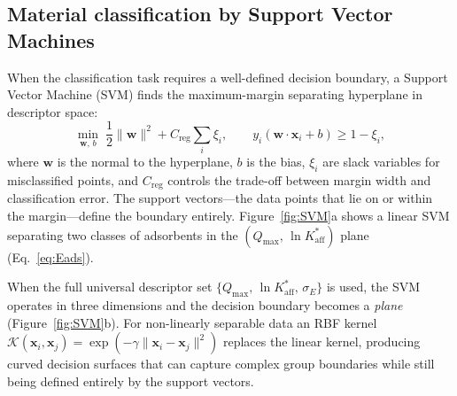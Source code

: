 \documentclass[journal=jacsat,manuscript=article]{achemso}
\begin{document}
	\subsection{Material classification by Support Vector Machines}
	\label{sec:SVM}

	When the classification task requires a well-defined decision boundary, a Support Vector Machine (SVM) finds the maximum-margin separating hyperplane in descriptor space:
	\begin{equation}
		\min_{\mathbf{w},\,b}\;
		\frac{1}{2}\|\mathbf{w}\|^2
		+ C_{\mathrm{reg}}\sum_{i}\xi_i,
		\qquad
		y_i(\mathbf{w}\cdot\mathbf{x}_i + b) \ge 1 - \xi_i,
		\label{eq:SVM}
	\end{equation}
	where $\mathbf{w}$ is the normal to the hyperplane, $b$ is the bias, $\xi_i$ are slack variables for misclassified points, and $C_{\mathrm{reg}}$ controls the trade-off between margin width and classification error. The support vectors---the data points that lie on or within the margin---define the boundary entirely. Figure~\ref{fig:SVM}a shows a linear SVM separating two classes of adsorbents in the $(Q_{\max},\, \ln K_{\mathrm{aff}}^{\ast})$ plane (Eq.~\eqref{eq:Eads}).

	When the full universal descriptor set $\{Q_{\max},\, \ln K_{\mathrm{aff}}^{\ast},\, \sigma_E\}$ is used, the SVM operates in three dimensions and the decision boundary becomes a \emph{plane} (Figure~\ref{fig:SVM}b). For non-linearly separable data an RBF kernel $\mathcal{K}(\mathbf{x}_i, \mathbf{x}_j) = \exp(-\gamma\|\mathbf{x}_i - \mathbf{x}_j\|^2)$ replaces the linear kernel, producing curved decision surfaces that can capture complex group boundaries while still being defined entirely by the support vectors.
\end{document}
